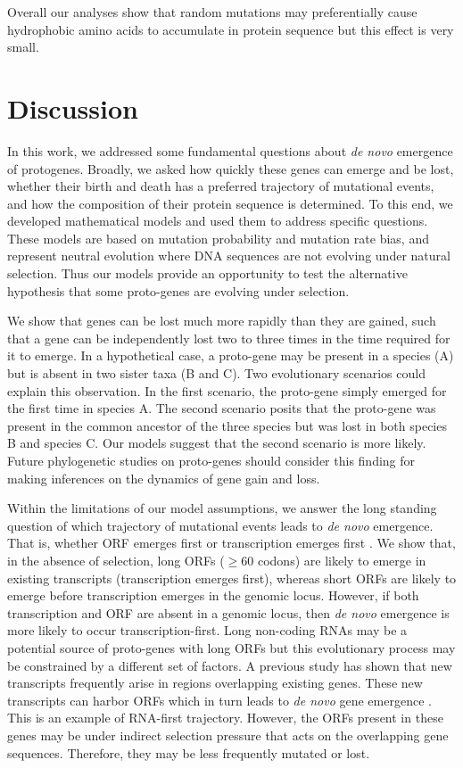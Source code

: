 \documentclass[12pt,a4paper]{article}
\begin{document}
Overall our analyses show that random mutations may preferentially cause hydrophobic amino acids to accumulate in protein sequence but this effect is very small.

\section{Discussion} 

In this work, we addressed some fundamental questions about \textit{de novo} emergence of protogenes. Broadly, we asked how quickly these genes can emerge and be lost, whether their birth and death has a preferred trajectory of mutational events, and how the composition of their protein sequence is determined. To this end, we developed mathematical models and used them to address specific questions. These models are based on mutation probability and mutation rate bias, and represent neutral evolution where DNA sequences are not evolving under natural selection. Thus our models provide an opportunity to test the alternative hypothesis that some proto-genes are evolving under selection.

We show that genes can be lost much more rapidly than they are gained, such that a gene can be independently lost two to three times in the time required for it to emerge. In a hypothetical case, a proto-gene may be present in a species (A) but is absent in two sister taxa (B and C). Two evolutionary scenarios could explain this observation. In the first scenario, the proto-gene simply emerged for the first time in species A. The second scenario posits that the proto-gene was present in the common ancestor of the three species but was lost in both species B and species C. Our models suggest that the second scenario is more likely. Future phylogenetic studies on proto-genes should consider this finding for making inferences on the dynamics of gene gain and loss.

Within the limitations of our model assumptions, we answer the long standing question of which trajectory of mutational events leads to \textit{de novo} emergence. That is, whether ORF emerges first or transcription emerges first \citep{EBB-F1000}. We show that, in the absence of selection, long ORFs ($\geq$60 codons) are likely to emerge in existing transcripts (transcription emerges first), whereas short ORFs are likely to emerge before transcription emerges in the genomic locus. However, if both transcription and ORF are absent in a genomic locus, then \textit{de novo} emergence is more likely to occur transcription-first. Long non-coding RNAs may be a potential source of proto-genes with long ORFs but this evolutionary process may be constrained by a different set of factors. A previous study has shown that new transcripts frequently arise in regions overlapping existing genes. These new transcripts can harbor ORFs which in turn leads to \textit{de novo} gene emergence \citep{albaYeastdenovo}. This is an example of RNA-first trajectory. However, the ORFs present in these genes may be under indirect selection pressure that acts on the overlapping gene sequences. Therefore, they may be less frequently mutated or lost.
\end{document}
